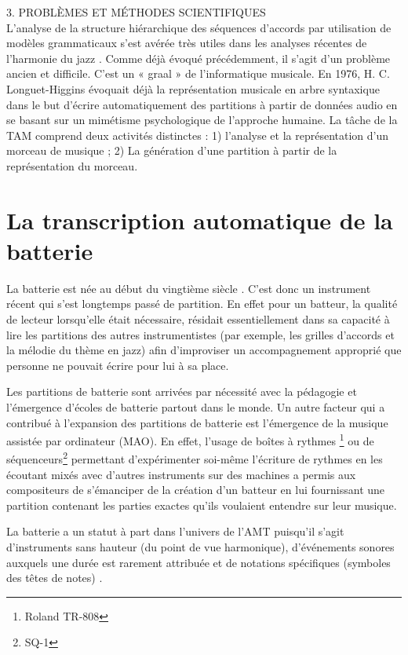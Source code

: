 3. PROBLÈMES ET MÉTHODES SCIENTIFIQUES\\
L’analyse de la structure hiérarchique des séquences d’accords par utilisation
de modèles grammaticaux s’est avérée très utiles dans les analyses récentes de
l’harmonie du jazz \cite{harasimjazz}. Comme déjà évoqué précédemment, il
s’agit d’un problème ancien et difficile. C’est un « graal » de l’informatique
musicale. En 1976, H. C. Longuet-Higgins \cite{first_one} évoquait déjà la
représentation musicale en arbre syntaxique dans le but d’écrire
automatiquement des partitions à partir de données audio en se basant sur un
mimétisme psychologique de l’approche humaine.
La tâche de la TAM comprend deux activités distinctes : 1) l’analyse et la
représentation d’un morceau de musique ; 2) La génération d’une partition à
partir de la représentation du morceau.
 
\section{La transcription automatique de la batterie}
La batterie est née au début du vingtième siècle \cite{histoire_drum_1}. C’est
donc un instrument récent qui s’est longtemps passé de partition. En effet
pour un batteur, la qualité de lecteur lorsqu’elle était nécessaire,
résidait essentiellement dans sa capacité à lire les partitions des autres
instrumentistes (par exemple, les grilles d’accords et la mélodie du thème en
jazz) afin d’improviser un accompagnement approprié que personne ne pouvait
écrire pour lui à sa place.
 
Les partitions de batterie sont arrivées par nécessité avec la pédagogie et
l’émergence d’écoles de batterie partout dans le monde. 
Un autre facteur qui a contribué à l’expansion des partitions de batterie est
l’émergence de la musique assistée par ordinateur (MAO). En effet, l’usage de
boîtes à rythmes \footnote{Roland TR-808} ou de séquenceurs\footnote{SQ-1}
permettant d’expérimenter soi-même l’écriture de rythmes en les écoutant mixés
avec d’autres instruments sur des machines a permis aux compositeurs de
s’émanciper de la création d’un batteur en lui fournissant une partition
contenant les parties exactes qu’ils voulaient entendre sur leur musique.

La batterie a un statut à part dans l’univers de l’AMT puisqu’il s’agit
d’instruments sans hauteur (du point de vue harmonique), d’événements sonores
auxquels une durée est rarement attribuée et de notations spécifiques (symboles
des têtes de notes) \cite{Review_ADT}.

